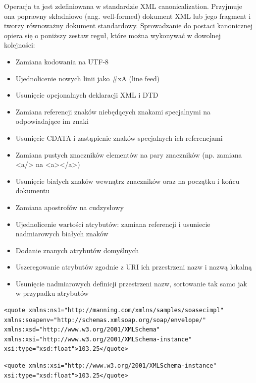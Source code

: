 Operacja ta jest zdefiniowana w standardzie XML canonicalization. Przyjmuje ona poprawny składniowo (ang. well-formed) dokument XML lub jego fragment i tworzy równoważny dokument standardowy\cite{Boyer:01:CXV}. Sprowadzanie do postaci kanonicznej opiera się o poniższy zestaw reguł, które można wykonywać w dowolnej kolejności:
\begin{itemize}
\item Zamiana kodowania na UTF-8
\item Ujednolicenie nowych linii jako \#xA (line feed)
\item Usunięcie opcjonalnych deklaracji XML i DTD
\item Zamiana referencji znaków niebędących znakami specjalnymi na odpowiadające im znaki
\item Usunięcie CDATA i zastąpienie znaków specjalnych ich referencjami
\item Zamiana pustych znaczników elementów na pary znaczników (np. zamiana <a/> na <a></a>)
\item Usunięcie białych znaków wewnątrz znaczników oraz na początku i końcu dokumentu
\item Zamiana apostrofów na cudzysłowy
\item Ujednolicenie wartości atrybutów: zamiana referencji i usuniecie nadmiarowych białych znaków
\item Dodanie znanych atrybutów domyślnych
\item Uszeregowanie atrybutów zgodnie z URI ich przestrzeni nazw i nazwą lokalną
\item Usunięcie nadmiarowych definicji przestrzeni nazw, sortowanie tak samo jak w przypadku atrybutów
\end{itemize}

		\begin{lstlisting}
<quote xmlns:ns1="http://manning.com/xmlns/samples/soasecimpl" 
xmlns:soapenv="http://schemas.xmlsoap.org/soap/envelope/" 
xmlns:xsd="http://www.w3.org/2001/XMLSchema" 
xmlns:xsi="http://www.w3.org/2001/XMLSchema-instance" 
xsi:type="xsd:float">103.25</quote>
		\end{lstlisting}
		
		\begin{lstlisting}
<quote xmlns:xsi="http://www.w3.org/2001/XMLSchema-instance" 
xsi:type="xsd:float">103.25</quote>
		\end{lstlisting}

